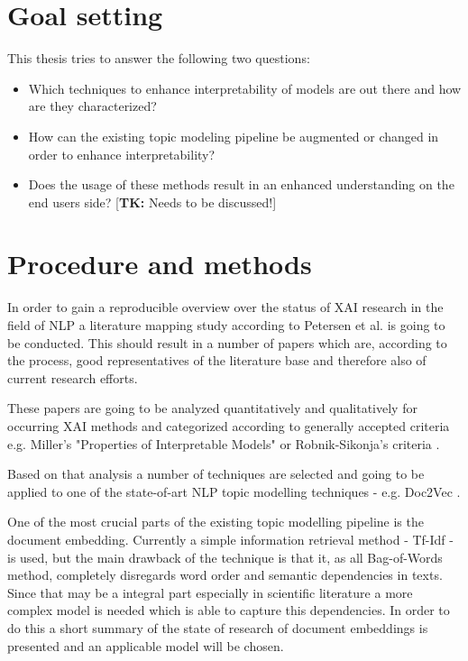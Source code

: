 \documentclass[pdftex,a4paper,12pt]{scrartcl}
\newcommand{\tk}[1]{\textcolor{tim}{[\textbf{TK:} #1]}}
\begin{document}
\section{Goal setting} 
This thesis tries to answer the following two questions:
\begin{itemize}
	\item Which techniques to enhance interpretability of models are out there and how are they characterized?
	\item How can the existing topic modeling pipeline be augmented or changed in order to enhance interpretability?
	\item Does the usage of these methods result in an enhanced understanding on the end users side? \tk{Needs to be discussed!}
\end{itemize}



\section{Procedure and methods}

In order to gain a reproducible overview over the status of XAI research in the field of NLP a literature mapping study according to Petersen et al. \cite{petersenSystematicMappingStudies} is going to be conducted. This should result in a number of papers which are, according to the process, good representatives of the literature base and therefore also of current research efforts. 

These papers are going to be analyzed quantitatively and qualitatively for occurring XAI methods and categorized according to generally accepted criteria e.g. Miller's "Properties of Interpretable Models" \cite{liptonMythosModelInterpretability2016} or Robnik-Sikonja's criteria \cite{robnik-sikonjaPerturbationBasedExplanationsPrediction2018}.

Based on that analysis a number of techniques are selected and going to be applied to one of the state-of-art NLP topic modelling techniques - e.g. Doc2Vec \cite{leDistributedRepresentationsSentences2014}.

One of the most crucial parts of the existing topic modelling pipeline is the document embedding. Currently a simple information retrieval method - Tf-Idf - is used, but the main drawback of the technique is that it, as all Bag-of-Words method, completely disregards word order and semantic dependencies in texts. Since that may be a integral part especially in scientific literature a more complex model is needed which is able to capture this dependencies. In order to do this a short summary of the state of research of document embeddings is presented and an applicable model will be chosen.
\end{document}

